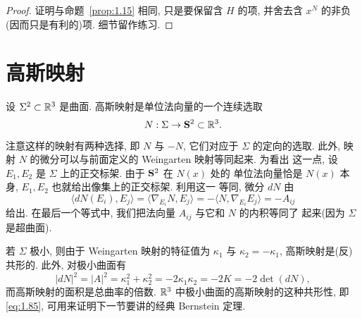 \begin{proof}
证明与命题~\ref{prop:1.15} 相同, 只是要保留含 $H$ 的项, 并舍去含 $x^{N}$
的非负(因而只是有利的)项. 细节留作练习.
\end{proof}

\section{高斯映射}
\label{sec:1.4}

设 $\Sigma^2\subset\mathbb{R}^3$ 是曲面. 高斯映射是单位法向量的一个连续选取
\begin{equation}
N:\Sigma\to\mathbf{S}^2\subset\mathbb{R}^3.
\label{eq:1.83}
\end{equation}
注意这样的映射有两种选择, 即 $N$ 与 $-N$, 它们对应于 $\Sigma$ 的定向的选取.
此外, 映射 $N$ 的微分可以与前面定义的 Weingarten 映射等同起来. 为看出
这一点, 设 $E_1,E_2$ 是 $\Sigma$ 上的正交标架. 由于 $\mathbf{S}^2$ 在 $N(x)$ 处的
单位法向量恰是 $N(x)$ 本身, $E_1,E_2$ 也就给出像集上的正交标架. 利用这一
等同, 微分 $dN$ 由
\begin{equation}
\langle dN(E_i),E_j\rangle
 =\langle\nabla_{E_i}N,E_j\rangle
 =-\langle N,\nabla_{E_i}E_j\rangle=-A_{ij}
\label{eq:1.84}
\end{equation}
给出. 在最后一个等式中, 我们把法向量 $A_{ij}$ 与它和 $N$ 的内积等同了
起来(因为 $\Sigma$ 是超曲面).

若 $\Sigma$ 极小, 则由于 Weingarten 映射的特征值为 $\kappa_1$ 与
$\kappa_2=-\kappa_1$, 高斯映射是(反)共形的. 此外, 对极小曲面有
\begin{equation}
|dN|^2=|A|^2=\kappa_1^2+\kappa_2^2
 =-2\kappa_1\kappa_2=-2K=-2\det(dN),
\label{eq:1.85}
\end{equation}
而高斯映射的面积是总曲率的倍数. $\mathbb{R}^3$ 中极小曲面的高斯映射的这种共形性,
即 \eqref{eq:1.85}, 可用来证明下一节要讲的经典 Bernstein 定理.

